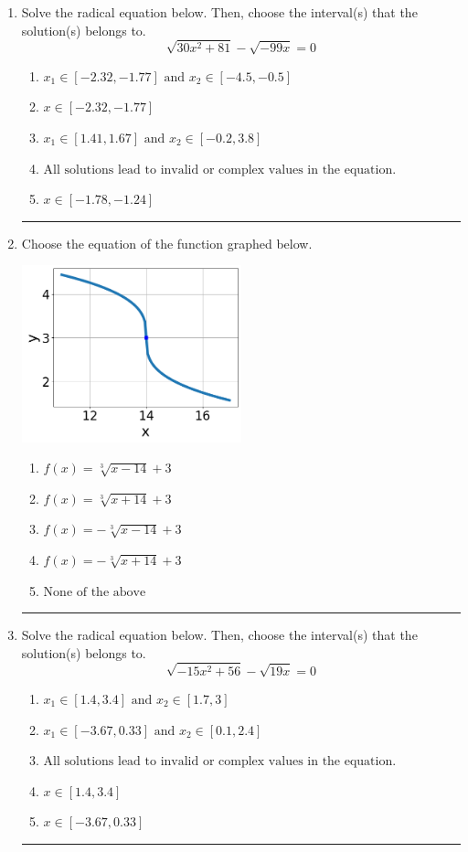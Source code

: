 \documentclass[14pt]{extbook}
\newcommand{\litem}[1]{\item#1\hspace*{-1cm}\rule{\textwidth}{0.4pt}}
\begin{document}
\begin{enumerate}
\litem{
Solve the radical equation below. Then, choose the interval(s) that the solution(s) belongs to.\[ \sqrt{30 x^2 + 81} - \sqrt{-99 x} = 0 \]\begin{enumerate}[label=\Alph*.]
\item \( x_1 \in [-2.32, -1.77] \text{ and } x_2 \in [-4.5,-0.5] \)
\item \( x \in [-2.32,-1.77] \)
\item \( x_1 \in [1.41, 1.67] \text{ and } x_2 \in [-0.2,3.8] \)
\item \( \text{All solutions lead to invalid or complex values in the equation.} \)
\item \( x \in [-1.78,-1.24] \)

\end{enumerate} }
\litem{
Choose the equation of the function graphed below.
\begin{center}
    \includegraphics[width=0.5\textwidth]{../Figures/radicalGraphToEquationB.png}
\end{center}
\begin{enumerate}[label=\Alph*.]
\item \( f(x) = \sqrt[3]{x - 14} + 3 \)
\item \( f(x) = \sqrt[3]{x + 14} + 3 \)
\item \( f(x) = - \sqrt[3]{x - 14} + 3 \)
\item \( f(x) = - \sqrt[3]{x + 14} + 3 \)
\item \( \text{None of the above} \)

\end{enumerate} }
\litem{
Solve the radical equation below. Then, choose the interval(s) that the solution(s) belongs to.\[ \sqrt{-15 x^2 + 56} - \sqrt{19 x} = 0 \]\begin{enumerate}[label=\Alph*.]
\item \( x_1 \in [1.4, 3.4] \text{ and } x_2 \in [1.7,3] \)
\item \( x_1 \in [-3.67, 0.33] \text{ and } x_2 \in [0.1,2.4] \)
\item \( \text{All solutions lead to invalid or complex values in the equation.} \)
\item \( x \in [1.4,3.4] \)
\item \( x \in [-3.67,0.33] \)


\end{enumerate}}
\end{enumerate}
\end{document}
